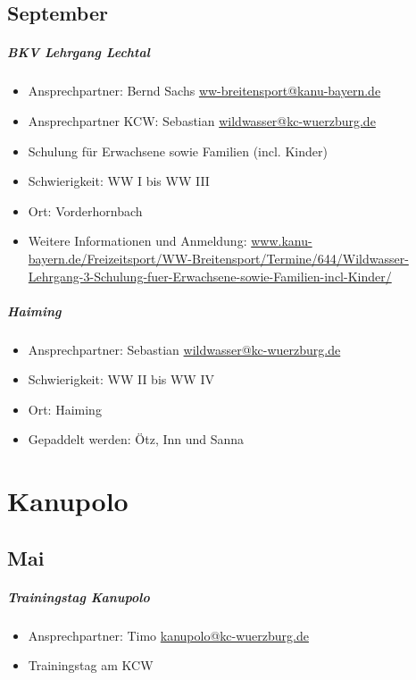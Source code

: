 \documentclass[12pt, a4paper]{report}
\begin{document}
\section*{September}\paragraph{BKV Lehrgang Lechtal}
\begin{itemize}
    \item Ansprechpartner: Bernd Sachs \href{mailto:ww-breitensport@kanu-bayern.de}{ww-breitensport@kanu-bayern.de}
    \item Ansprechpartner KCW: Sebastian \href{mailto:wildwasser@kc-wuerzburg.de}{wildwasser@kc-wuerzburg.de}
    \item Schulung für Erwachsene sowie Familien (incl. Kinder)
    \item Schwierigkeit: WW I bis WW III
    \item Ort: Vorderhornbach
    \item Weitere Informationen und Anmeldung: \url{www.kanu-bayern.de/Freizeitsport/WW-Breitensport/Termine/644/Wildwasser-Lehrgang-3-Schulung-fuer-Erwachsene-sowie-Familien-incl-Kinder/}
\end{itemize}

\paragraph{Haiming}
\begin{itemize}
    \item Ansprechpartner: Sebastian \href{mailto:wildwasser@kc-wuerzburg.de}{wildwasser@kc-wuerzburg.de}
    \item Schwierigkeit: WW II bis WW IV
    \item Ort: Haiming
    \item Gepaddelt werden: Ötz, Inn und Sanna
\end{itemize}


\chapter*{Kanupolo}
\thispagestyle{Kanupolo}
\pagestyle{Kanupolo}
\section*{Mai}\paragraph{Trainingstag Kanupolo}
\begin{itemize}
    \item Ansprechpartner: Timo \href{mailto:kanupolo@kc-wuerzburg.de}{kanupolo@kc-wuerzburg.de}
    \item Trainingstag am KCW
\end{itemize}
\end{document}

